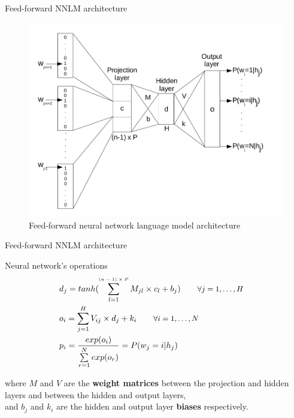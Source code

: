 \documentclass{beamer}
\begin{document}
\begin{frame}{Feed-forward NNLM architecture}

\begin{figure}[!htb]\centering
    \includegraphics[width=0.8\linewidth]{./images/architecture.png}
    \caption{Feed-forward neural network language model architecture}\label{diagram:architecture}
\end{figure}

\end{frame}


\begin{frame}{Feed-forward NNLM architecture}

\begin{exampleblock}{Neural network's operations}
\begin{equation}
\left.\begin{aligned}
    &d_j = tanh(\sum\limits_{l=1}^{\text{\tiny{$(n-1) \times P$}}}{M_{jl} \times c_l + b_j}) \qquad \text{\small{$\forall j = 1, \ldots, H$}}&\\
    &o_i = \sum\limits_{j=1}^{H}{V_{ij} \times d_j + k_i} \qquad \text{\small{$\forall i = 1, \ldots, N$}}&\\
    &p_i = \frac{exp(o_i)}{\sum\limits_{r=1}^{N}{exp(o_r)}} = P(w_j = i | h_j)&\\
\end{aligned}\right.
\end{equation}
\end{exampleblock}

where $M$ and $V$ are the \textbf{weight matrices} between the projection and hidden layers and between the hidden and output layers, \\
and $b_j$ and $k_i$ are the hidden and output layer \textbf{biases} respectively.

\end{frame}
\end{document}
